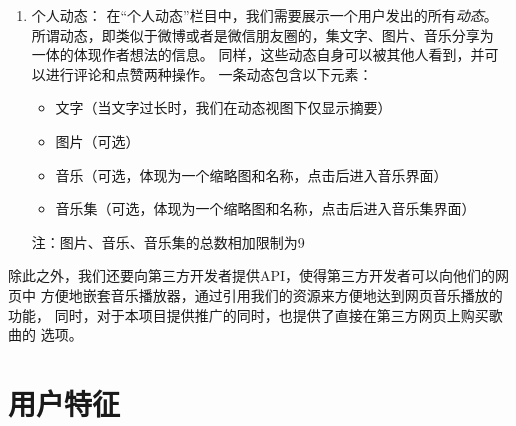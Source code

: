 \begin{enumerate}
{\begin{enumerate}
\begin{itemize}
                \item 点赞按钮，以及总共的点赞次数
            \end{itemize}
        \item 个人动态：
            在``个人动态''栏目中，我们需要展示一个用户发出的所有\emph{动态}。
            所谓动态，即类似于微博或者是微信朋友圈的，集文字、图片、音乐分享为
            一体的体现作者想法的信息。
            同样，这些动态自身可以被其他人看到，并可以进行评论和点赞两种操作。 
            一条动态包含以下元素：
            \begin{itemize}
                \item 文字（当文字过长时，我们在动态视图下仅显示摘要）
                \item 图片（可选）
                \item 音乐（可选，体现为一个缩略图和名称，点击后进入音乐界面）
                \item 音乐集（可选，体现为一个缩略图和名称，点击后进入音乐集界面）
            \end{itemize}        
            注：图片、音乐、音乐集的总数相加限制为9
        \end{enumerate}    
    }
\fi
\end{enumerate}

除此之外，我们还要向第三方开发者提供API，使得第三方开发者可以向他们的网页中
    方便地嵌套音乐播放器，通过引用我们的资源来方便地达到网页音乐播放的功能，
    同时，对于本项目提供推广的同时，也提供了直接在第三方网页上购买歌曲的
    选项。    

\section{用户特征}

